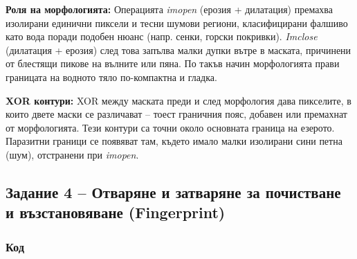 \textbf{Роля на морфологията:} Операцията \textit{imopen} (ерозия + дилатация) премахва изолирани единични пиксели и тесни шумови региони, класифицирани фалшиво като вода поради подобен нюанс (напр. сенки, горски покривки). \textit{Imclose} (дилатация + ерозия) след това запълва малки дупки вътре в маската, причинени от блестящи пикове на вълните или пяна. По такъв начин морфологията прави границата на водното тяло по-компактна и гладка.

\textbf{XOR контури:} XOR между маската преди и след морфология дава пикселите, в които двете маски се различават – тоест граничния пояс, добавен или премахнат от морфологията. Тези контури са точни около основната граница на езерото. Паразитни граници се появяват там, където имало малки изолирани сини петна (шум), отстранени при \textit{imopen}.

\subsection{Задание 4 – Отваряне и затваряне за почистване и възстановяване (Fingerprint)}

\subsubsection{Код}

